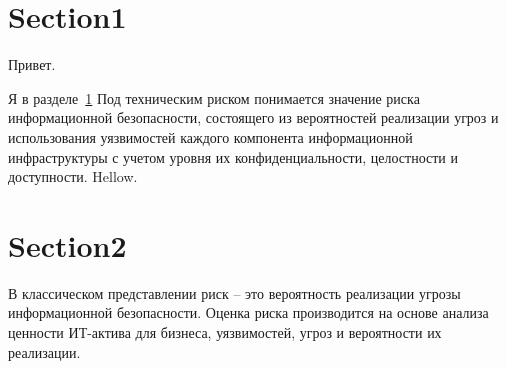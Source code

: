\documentclass[a4paper, 12pt]{article}
\begin{document}
    \section{Section1}\label{sec:introduction}
    Привет.~\cite{managementsystem}

    Я в разделе~\ref{sec:introduction}
	Под техническим риском понимается значение риска информационной безопасности, состоящего из вероятностей реализации угроз и использования уязвимостей каждого компонента
	информационной инфраструктуры с учетом уровня их конфиденциальности, целостности и доступности.
    Hellow.
    \section{Section2}\label{sec:introduction2}
    В классическом представлении риск – это вероятность реализации угрозы информационной безопасности.
    Оценка риска производится на основе анализа ценности ИТ-актива для бизнеса, уязвимостей, угроз и вероятности их реализации.
    
    
\end{document}
